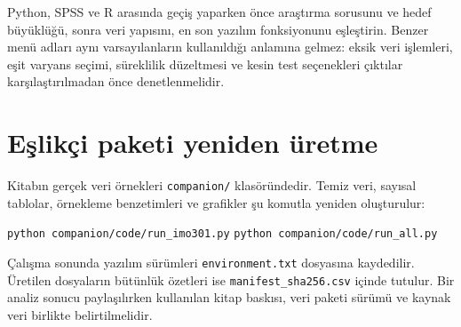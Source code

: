 Python, SPSS ve R arasında geçiş yaparken önce araştırma sorusunu ve hedef
büyüklüğü, sonra veri yapısını, en son yazılım fonksiyonunu eşleştirin. Benzer
menü adları aynı varsayılanların kullanıldığı anlamına gelmez: eksik veri
işlemleri, eşit varyans seçimi, süreklilik düzeltmesi ve kesin test seçenekleri
çıktılar karşılaştırılmadan önce denetlenmelidir.

\section*{Eşlikçi paketi yeniden üretme}

Kitabın gerçek veri örnekleri \texttt{companion/} klasöründedir. Temiz veri,
sayısal tablolar, örnekleme benzetimleri ve grafikler şu komutla yeniden
oluşturulur:
\begin{center}
\ifimoders
\texttt{python companion/code/run\_imo301.py}
\else
\texttt{python companion/code/run\_all.py}
\fi
\end{center}
Çalışma sonunda yazılım sürümleri \texttt{environment.txt} dosyasına
kaydedilir. Üretilen dosyaların bütünlük özetleri ise
\texttt{manifest\_sha256.csv} içinde tutulur. Bir analiz sonucu paylaşılırken
kullanılan kitap baskısı, veri paketi sürümü ve kaynak veri birlikte
belirtilmelidir.